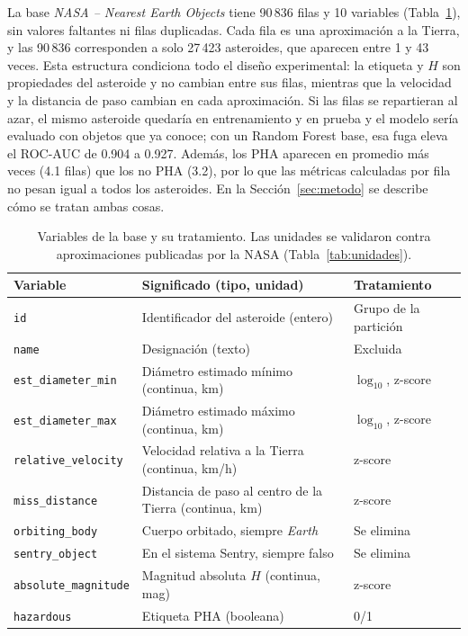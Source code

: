 \documentclass[conference]{IEEEtran}
\newcommand{\code}[1]{\texttt{#1}}
\begin{document}
La base \emph{NASA -- Nearest Earth Objects} \cite{kaggle} tiene 90\,836 filas y 10 variables (Tabla~\ref{tab:vars}), sin valores faltantes ni filas duplicadas. Cada fila es una aproximación a la Tierra, y las 90\,836 corresponden a solo 27\,423 asteroides, que aparecen entre 1 y 43 veces. Esta estructura condiciona todo el diseño experimental: la etiqueta y $H$ son propiedades del asteroide y no cambian entre sus filas, mientras que la velocidad y la distancia de paso cambian en cada aproximación. Si las filas se repartieran al azar, el mismo asteroide quedaría en entrenamiento y en prueba y el modelo sería evaluado con objetos que ya conoce; con un Random Forest base, esa fuga eleva el ROC-AUC de 0.904 a 0.927. Además, los PHA aparecen en promedio más veces (4.1 filas) que los no PHA (3.2), por lo que las métricas calculadas por fila no pesan igual a todos los asteroides. En la Sección~\ref{sec:metodo} se describe cómo se tratan ambas cosas.

\begin{table}[t]
\centering
\caption{Variables de la base y su tratamiento. Las unidades se validaron contra aproximaciones publicadas por la NASA (Tabla~\ref{tab:unidades}).}
\label{tab:vars}
\footnotesize
\begin{tabular}{@{}p{}p{}p{}@{}}
\toprule
Variable & Significado (tipo, unidad) & Tratamiento\\
\midrule
\code{id} & Identificador del asteroide (entero) & Grupo de la partición\\
\code{name} & Designación (texto) & Excluida\\
\code{est\_diameter\_min} & Diámetro estimado mínimo (continua, km) & $\log_{10}$, z-score\\
\code{est\_diameter\_max} & Diámetro estimado máximo (continua, km) & $\log_{10}$, z-score\\
\code{relative\_velocity} & Velocidad relativa a la Tierra (continua, km/h) & z-score\\
\code{miss\_distance} & Distancia de paso al centro de la Tierra (continua, km) & z-score\\
\code{orbiting\_body} & Cuerpo orbitado, siempre \emph{Earth} & Se elimina\\
\code{sentry\_object} & En el sistema Sentry, siempre falso & Se elimina\\
\code{absolute\_magnitude} & Magnitud absoluta $H$ (continua, mag) & z-score\\
\code{hazardous} & Etiqueta PHA (booleana) & 0/1\\
\bottomrule
\end{tabular}
\end{table}
\end{document}
